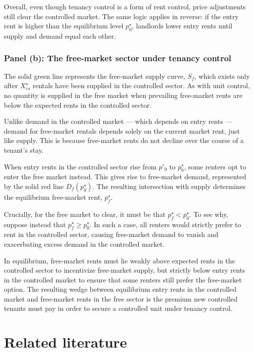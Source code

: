 \documentclass[parskip=full]{article}
\begin{document}
Overall, even though tenancy control is a form of rent control, price adjustments still clear the controlled market. The same logic applies in reverse: if the entry rent is higher than the equilibrium level $p^{\star}_0$, landlords lower entry rents until supply and demand equal each other. 

\subsubsection{Panel (b): The free-market sector under tenancy control}

The solid green line represents the free-market supply curve, $S_f$, which exists only after $X^{\star}_{cs}$ rentals have been supplied in the controlled sector. As with unit control, no quantity is supplied in the free market when prevailing free-market rents are below the expected rents in the controlled sector.

Unlike demand in the controlled market — which depends on entry rents — demand for free-market rentals depends solely on the current market rent, just like supply. This is because free-market rents do not decline over the course of a tenant’s stay.

When entry rents in the controlled sector rise from $p'_0$ to $p^{\star}_0$, some renters opt to enter the free market instead. This gives rise to free-market demand, represented by the solid red line $D_f(p^{\star}_0)$. The resulting intersection with supply determines the equilibrium free-market rent, $p^{\star}_f$.

Crucially, for the free market to clear, it must be that $p^{\star}_f < p^{\star}_0$. To see why, suppose instead that $p^{\star}_f \geq p^{\star}_0$. In such a case, all renters would strictly prefer to rent in the controlled sector, causing free-market demand to vanish and exacerbating excess demand in the controlled market.

In equilibrium, free-market rents must lie weakly above expected rents in the controlled sector to incentivize free-market supply, but strictly below entry rents in the controlled market to ensure that some renters still prefer the free-market option. The resulting wedge between equilibrium entry rents in the controlled market and free-market rents in the free sector is the premium new controlled tenants must pay in order to secure a controlled unit under tenancy control.

\section{Related literature}\label{sec:related_lit}
\end{document}
